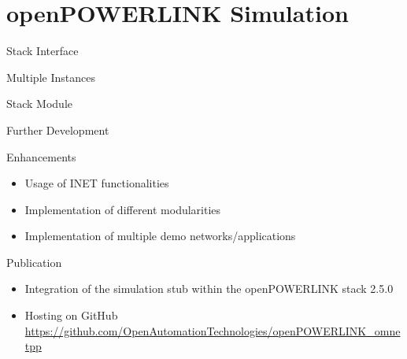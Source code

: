 \section{openPOWERLINK Simulation}
\begin{frame}{Stack Interface}
\end{frame}

\begin{frame}{Multiple Instances}
\end{frame}

\begin{frame}{Stack Module}
\end{frame}

\begin{frame}{Further Development}
    \begin{block}{Enhancements}
        \begin{itemize}
            \item Usage of INET functionalities
            \item Implementation of different modularities
            \item Implementation of multiple demo networks/applications
        \end{itemize}
    \end{block}
    \begin{block}{Publication}
        \begin{itemize}
            \item Integration of the simulation stub within the openPOWERLINK stack 2.5.0
            \item Hosting on GitHub\\
            \url{https://github.com/OpenAutomationTechnologies/openPOWERLINK\_omnetpp}
        \end{itemize}
    \end{block}
\end{frame}